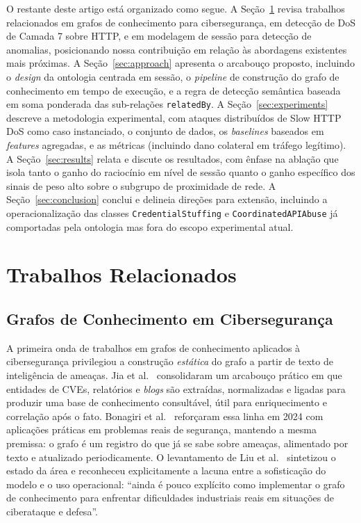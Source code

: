 \documentclass[preprint,12pt]{elsarticle}
\begin{document}
O restante deste artigo está organizado como segue. A Seção~\ref{sec:related} revisa trabalhos relacionados em grafos de conhecimento para cibersegurança, em detecção de DoS de Camada 7 sobre HTTP, e em modelagem de sessão para detecção de anomalias, posicionando nossa contribuição em relação às abordagens existentes mais próximas. A Seção~\ref{sec:approach} apresenta o arcabouço proposto, incluindo o \emph{design} da ontologia centrada em sessão, o \emph{pipeline} de construção do grafo de conhecimento em tempo de execução, e a regra de detecção semântica baseada em soma ponderada das sub-relações \texttt{relatedBy}. A Seção~\ref{sec:experiments} descreve a metodologia experimental, com ataques distribuídos de Slow HTTP DoS como caso instanciado, o conjunto de dados, os \emph{baselines} baseados em \emph{features} agregadas, e as métricas (incluindo dano colateral em tráfego legítimo). A Seção~\ref{sec:results} relata e discute os resultados, com ênfase na ablação que isola tanto o ganho do raciocínio em nível de sessão quanto o ganho específico dos sinais de peso alto sobre o subgrupo de proximidade de rede. A Seção~\ref{sec:conclusion} conclui e delineia direções para extensão, incluindo a operacionalização das classes \texttt{CredentialStuffing} e \texttt{CoordinatedAPIAbuse} já comportadas pela ontologia mas fora do escopo experimental atual.


\section{Trabalhos Relacionados}
\label{sec:related}

\subsection{Grafos de Conhecimento em Cibersegurança}
\label{sec:related:kg}

A primeira onda de trabalhos em grafos de conhecimento aplicados à cibersegurança privilegiou a construção \emph{estática} do grafo a partir de texto de inteligência de ameaças. Jia et al.~\cite{jia2018practical} consolidaram um arcabouço prático em que entidades de CVEs, relatórios e \emph{blogs} são extraídas, normalizadas e ligadas para produzir uma base de conhecimento consultável, útil para enriquecimento e correlação após o fato. Bonagiri et al.~\cite{bonagiri2024practical} reforçaram essa linha em 2024 com aplicações práticas em problemas reais de segurança, mantendo a mesma premissa: o grafo é um registro do que já se sabe sobre ameaças, alimentado por texto e atualizado periodicamente. O levantamento de Liu et al.~\cite{liu2022recent} sintetizou o estado da área e reconheceu explicitamente a lacuna entre a sofisticação do modelo e o uso operacional: ``ainda é pouco explícito como implementar o grafo de conhecimento para enfrentar dificuldades industriais reais em situações de ciberataque e defesa''.
\end{document}
